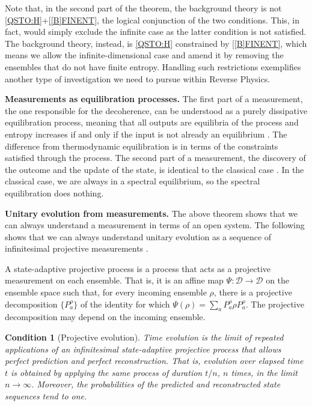 \documentclass[entropy,article,submit,moreauthors]{Definitions/mdpi}
\newtheorem{condth}{Condition}
\renewcommand*{\thecondth}{\Roman{condth}}
\newenvironment{condition}[2][]{\renewcommand{\thecondth}{#2}\begin{condth}[#1]\label{#2}}{\end{condth}\renewcommand{\thecondth}{\Roman{condth}}}
\begin{document}
Note that, in the second part of the theorem, the background theory is not \ref{QSTO:H}+\ref{[B]FINENT}, the logical conjunction of the two conditions. This, in fact, would simply exclude the infinite case as the latter condition is not satisfied. The background theory, instead, is \ref{QSTO:H} constrained by \ref{[B]FINENT}, which means we allow the infinite-dimensional case and amend it by removing the ensembles that do not have finite entropy. Handling such restrictions exemplifies another type of investigation we need to pursue within Reverse Physics.

\textbf{Measurements as equilibration processes.} The first part of a measurement, the one responsible for the decoherence, can be understood as a purely dissipative equilibration process, meaning that all outputs are equilibria of the process and entropy increases if and only if the input is not already an equilibrium \cite{nielsen2010quantum,Preskill1998}. The difference from thermodynamic equilibration is in terms of the constraints satisfied through the process. The second part of a measurement, the discovery of the outcome and the update of the state, is identical to the classical case \cite{Ozawa1985}. In the classical case, we are always in a spectral equilibrium, so the spectral equilibration does nothing.

\textbf{Unitary evolution from measurements.} The above theorem shows that we can always understand a measurement in terms of an open system. The following shows that we can always understand unitary evolution as a sequence of infinitesimal projective measurements \cite{Carcassi2026UnitaryProjectiveEvolution}.

\begin{Definition}
	A state-adaptive projective process is a process that acts as a projective measurement on each ensemble. That is, it is an affine map $\Psi: \mathcal{D} \to \mathcal{D}$ on the ensemble space such that, for every incoming ensemble $\rho$, there is a projective decomposition $\{P_a^\rho\}$ of the identity for which $\Psi(\rho)=\sum_a P_a^\rho\rho P_a^\rho$. The projective decomposition may depend on the incoming ensemble.
\end{Definition}

\begin{condition}[Projective evolution]{DR-PROJ}
	Time evolution is the limit of repeated applications of an infinitesimal state-adaptive projective process that allows perfect prediction and perfect reconstruction. That is, evolution over elapsed time $t$ is obtained by applying the same process of duration $t/n$, $n$ times, in the limit $n\to\infty$. Moreover, the probabilities of the predicted and reconstructed state sequences tend to one.
\end{condition}
\end{document}
